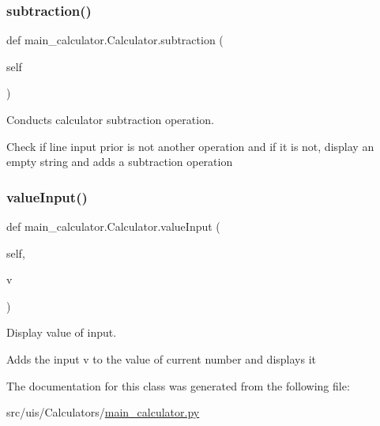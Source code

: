 \subsubsection{\texorpdfstring{subtraction()}{subtraction()}}
{\footnotesize\ttfamily def main\+\_\+calculator.\+Calculator.\+subtraction (\begin{DoxyParamCaption}\item[{}]{self }\end{DoxyParamCaption})}



Conducts calculator subtraction operation. 

Check if line input prior is not another operation and if it is not, display an empty string and adds a subtraction operation \mbox{\label{classmain__calculator_1_1_calculator_a9a9b05869e5fd1f5110bbe8d8005ba43}} 
\subsubsection{\texorpdfstring{value\+Input()}{valueInput()}}
{\footnotesize\ttfamily def main\+\_\+calculator.\+Calculator.\+value\+Input (\begin{DoxyParamCaption}\item[{}]{self,  }\item[{}]{v }\end{DoxyParamCaption})}



Display value of input. 

Adds the input v to the value of current number and displays it 

The documentation for this class was generated from the following file\+:\begin{DoxyCompactItemize}
\item 
src/uis/\+Calculators/\hyperlink{main__calculator_8py}{main\+\_\+calculator.\+py}\end{DoxyCompactItemize}
